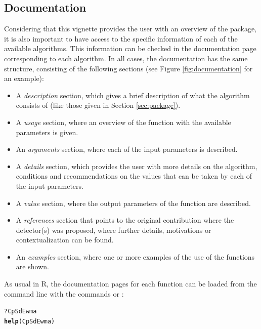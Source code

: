 \documentclass[a4paper]{article}\usepackage[]{graphicx}\usepackage[]{color}
\makeatletter
\newcommand{\hlopt}[1]{\textcolor[rgb]{0,0,0}{#1}}%
\newcommand{\hlstd}[1]{\textcolor[rgb]{0.345,0.345,0.345}{#1}}%
\newcommand{\hlkwd}[1]{\textcolor[rgb]{0.737,0.353,0.396}{\textbf{#1}}}%
\newenvironment{kframe}{%
 \def\at@end@of@kframe{}%
 \ifinner\ifhmode%
  \def\at@end@of@kframe{\end{minipage}}%
  \begin{minipage}{\columnwidth}%
 \fi\fi%
 \def\FrameCommand##1{\hskip\@totalleftmargin \hskip-\fboxsep
 \colorbox{shadecolor}{##1}\hskip-\fboxsep
     \hskip-\linewidth \hskip-\@totalleftmargin \hskip\columnwidth}%
 \MakeFramed {\advance\hsize-\width
   \@totalleftmargin\z@ \linewidth\hsize
   \@setminipage}}%
 {\par\unskip\endMakeFramed%
 \at@end@of@kframe}
\newenvironment{knitrout}{}{} %
\makeatother
\begin{document}
\subsection{Documentation}\label{sec:documentation}

Considering that this vignette provides the user with an overview of the  package, it is also important to have access to the specific information of each of the available algorithms. This information can be checked in the documentation page corresponding to each algorithm. In all cases, the documentation has the same structure, consisting of the following sections (see Figure \ref{fig:documentation} for an example):

\begin{itemize}
\item A \emph{description} section, which gives a brief description of what the algorithm consists of (like those given in Section \ref{sec:package}).
\item A \emph{usage} section, where an overview of the function with the available parameters is given.
\item An \emph{arguments} section, where each of the input parameters is described.
\item A \emph{details} section, which provides the user with more details on the algorithm, conditions and recommendations on the values that can be taken by each of the input parameters.
\item A \emph{value} section, where the output parameters of the function are described.
\item A \emph{references} section that points to the original contribution where the detector(s) was proposed, where further details, motivations or contextualization can be found.
\item An \emph{examples} section, where one or more examples of the use of the functions are shown.
\end{itemize}

As usual in R, the documentation pages for each function can be loaded from the command line with the commands  or :

\begin{knitrout}
\color{fgcolor}\begin{kframe}
\begin{alltt}
\hlopt{?}\hlstd{CpSdEwma}
\hlkwd{help}\hlstd{(CpSdEwma)}
\end{alltt}
\end{kframe}
\end{knitrout}
\end{document}
